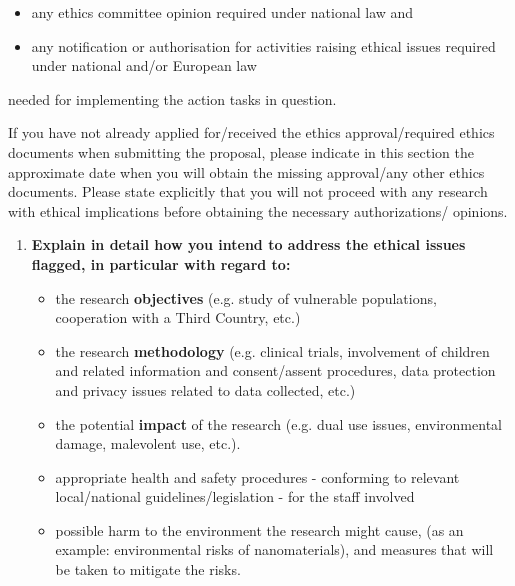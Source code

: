 \begin{itemize}
	\item any ethics committee opinion required under national law and 
	\item any notification or authorisation for activities raising ethical issues required under national and/or European law 
\end{itemize}

\medskip\noindent
needed for implementing the action tasks in question.

\medskip\noindent
If you have not already applied for/received the ethics approval/required ethics documents when submitting the proposal, please indicate in this section the approximate date when you will obtain the missing approval/any other ethics documents. Please state explicitly that you will not proceed with any research with ethical implications before obtaining the necessary authorizations/ opinions.

\medskip\noindent
{}

\bigskip
{\bf 
	\begin{enumerate}[resume, start=2]
		\item \textbf{Explain in detail how you intend to address the ethical issues flagged, in particular with regard to:}
		\begin{itemize}
			\item the research \textbf{objectives} (e.g. study of vulnerable populations, cooperation with a Third Country, etc.)
			\item the research \textbf{methodology} (e.g. clinical trials, involvement of children and related information and consent/assent procedures, data protection and privacy issues related to data collected, etc.)
			\item the potential \textbf{impact} of the research (e.g. dual use issues, environmental damage, malevolent use, etc.).
			\item appropriate health and safety procedures - conforming to relevant local/national guidelines/legislation - for the staff involved
			\item possible harm to the environment the research might cause, (as an example:  environmental risks of nanomaterials), and measures that will be taken to mitigate the risks.
		\end{itemize}
	\end{enumerate}
}




